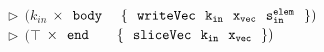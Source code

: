 \begin{tabbing}
 \>     \>
 \>     \> 
        \> $\rhd~~ (k_{in}$
        \> $\times~~ \tt{body}~~~~
                \{~~ \tt{writeVec}~~ k_{in}~~ x_{vec}~~ s^{elem}_{in}~~ \})$
 \\[0.5ex]

 \>     \>
 \>     \>
        \> $\rhd~~ (\top$
        \> $\times~~ \tt{end}~~~~~~
                \{~~ \tt{sliceVec}~~ k_{in}~~ x_{vec}~~ \})$

 \\ [1em]
\end{tabbing}





